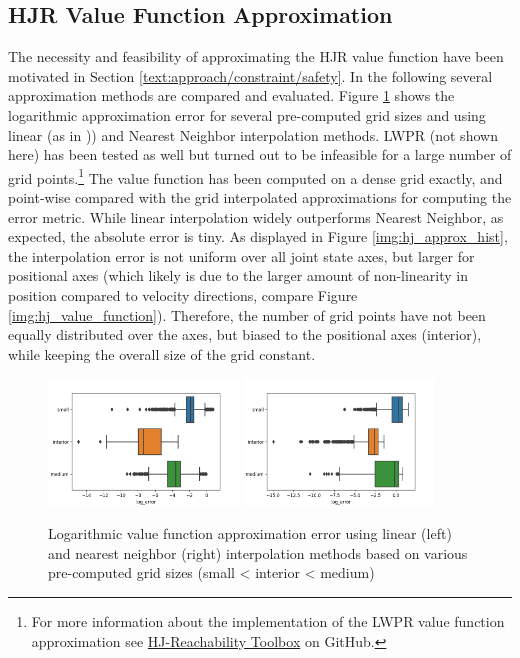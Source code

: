 \subsection{HJR Value Function Approximation}
The necessity and feasibility of approximating the \ac{HJR} value function have been motivated in Section \ref{text:approach/constraint/safety}. In the following several approximation methods are compared and evaluated.
\newline 
Figure \ref{img:hj_approx_bar} shows the logarithmic approximation error for several pre-computed grid sizes and using linear (as in \cite{Leung2020})) and Nearest Neighbor interpolation methods. LWPR (not shown here) has been tested as well but turned out to be infeasible for a large number of grid points.\footnote{For more information about the implementation of the LWPR value function approximation see \href{https://github.com/simon-schaefer/HJReachibility}{HJ-Reachability Toolbox} on GitHub.} The value function has been computed on a dense grid exactly, and point-wise compared with the grid interpolated approximations for computing the error metric. While linear interpolation widely outperforms Nearest Neighbor, as expected, the absolute error is tiny. As displayed in Figure \ref{img:hj_approx_hist}, the interpolation error is not uniform over all joint state axes, but larger for positional axes (which likely is due to the larger amount of non-linearity in position compared to velocity directions, compare Figure \ref{img:hj_value_function}). Therefore, the number of grid points have not been equally distributed over the axes, but biased to the positional axes (interior), while keeping the overall size of the grid constant.

\begin{figure}[!ht]
\begin{center}
\includegraphics[width=0.45\textwidth]{images/hj_bar_linear.png}
\includegraphics[width=0.45\textwidth]{images/hj_bar_nearest.png}
\caption{Logarithmic value function approximation error using linear (left) and nearest neighbor (right) interpolation methods based on various pre-computed grid sizes (small < interior < medium)}
\label{img:hj_approx_bar}
\end{center}
\end{figure}

